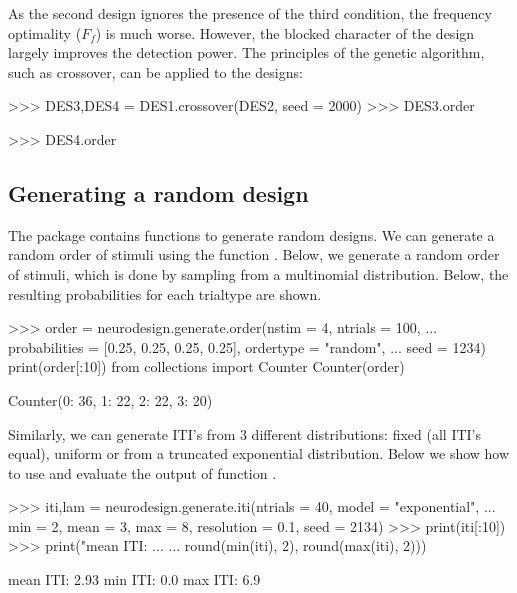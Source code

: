 \documentclass[article]{jss}
\begin{document}
%
As the second design ignores the presence of the third condition, the
frequency optimality ($F_f$) is much worse.  However, the blocked
character of the design largely improves the detection power.  The
principles of the genetic algorithm, such as crossover, can be applied
to the designs:
\begin{CodeChunk}
\begin{CodeInput}
>>> DES3,DES4 = DES1.crossover(DES2, seed = 2000)
>>> DES3.order
\end{CodeInput}
\begin{CodeOutput}
[0, 1, 2, 0, 1, 2, 0, 1, 1, 1, 0, 0, 0, 0, 0, 1, 1, 1, 1, 1]
\end{CodeOutput}
\begin{CodeInput}
>>> DES4.order
\end{CodeInput}
\begin{CodeOutput}
[0, 0, 0, 0, 0, 1, 1, 1, 2, 0, 1, 2, 0, 1, 2, 0, 1, 2, 0, 1]
\end{CodeOutput}
\end{CodeChunk}
%
\subsection{Generating a random design}\label{sec:gener-rand-design}

The package contains functions to generate random designs.  We can
generate a random order of stimuli using the function
.  Below, we generate a random order of
stimuli, which is done by sampling from a multinomial distribution.
Below, the resulting probabilities for each trialtype are shown.
\begin{CodeChunk}
\begin{CodeInput}
>>> order = neurodesign.generate.order(nstim = 4, ntrials = 100,
...   probabilities = [0.25, 0.25, 0.25, 0.25], ordertype = "random",
...   seed = 1234)
print(order[:10])
from collections import Counter
Counter(order)
\end{CodeInput}
\begin{CodeOutput}
[3, 0, 0, 2, 0, 0, 2, 2, 2, 0]
Counter({0: 36, 1: 22, 2: 22, 3: 20})
\end{CodeOutput}
\end{CodeChunk}
%
Similarly, we can generate ITI's from 3 different distributions: fixed
(all ITI's equal), uniform or from a truncated exponential
distribution.  Below we show how to use and evaluate the output of
function .
\begin{CodeChunk}
\begin{CodeInput}
>>> iti,lam = neurodesign.generate.iti(ntrials = 40, model = "exponential",
...   min = 2, mean = 3, max = 8, resolution = 0.1, seed = 2134)
>>> print(iti[:10])
>>> print("mean ITI: %
...   %
...   round(min(iti), 2), round(max(iti), 2)))
\end{CodeInput}
\begin{CodeOutput}
[0.  2.  2.1 2.  2.  2.  5.4 2.  2.4 5.1]
mean ITI: 2.93
min ITI: 0.0
max ITI: 6.9
\end{CodeOutput}
\end{CodeChunk}
%
\end{document}
